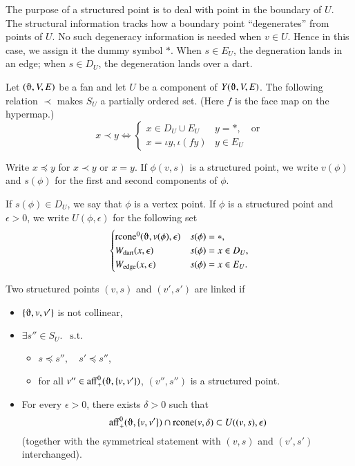 \begin{remark} The purpose of a structured point is to deal with point in the boundary of $U$.  The structural information  tracks how a boundary point ``degenerates'' from points of $U$.  No such degeneracy information is needed when $v\in U$.  Hence in this case, we assign it the dummy symbol $*$.  When $s\in E_U$, the degneration lands in an edge; when $s\in D_U$, the degeneration lands over a dart.
\end{remark}

\begin{lemma}
Let $(\orgn,V,E)$ be a fan and let $U$ be a component of $Y(\orgn,V,E)$.
The following relation $\prec$ makes $S_U$
a partially ordered set.  (Here $f$ is the face map on the hypermap.)
$$
x \prec y \Leftrightarrow   
\begin{cases}
   x \in D_U\cup E_U & y = *,\quad {\text{or}}\\
   x = \iota y, \iota (f y) & y \in E_U
\end{cases}
$$
\end{lemma}

Write $x \preceq y$ for $x \prec y$ or $x = y$.
If $\phi(v,s)$ is a structured point, we write $v(\phi)$ and $s(\phi)$ for the first and second components of $\phi$.  

If $s(\phi)\in D_U$, we say that $\phi$ is a vertex point.  If $\phi$ is a structured point and $\epsilon > 0$, we write $U(\phi,\epsilon)$ for the following set
$$
\begin{cases}
  \op{rcone}^0(\orgn,v(\phi),\epsilon)&s(\phi) = *,   \\
  \Wdart(x,\epsilon)& s(\phi) = x\in D_U,   \\
  \Wedge(x,\epsilon) &s(\phi) = x\in E_U.   \\
\end{cases}
$$

\begin{definition}[link]\label{def:link}  Two structured points $(v,s)$
and $(v',s')$ are linked if
\begin{itemize}
 \item $\{\orgn,v,v'\}$ is not collinear,
 \item $\exists s''\in S_U.\ \ {\text{ s.t.}}$
   \begin{itemize}
     \item $s \preceq s'',\quad s'\preceq s''$,
      \item for all $v''\in\op{aff}_+^0(\orgn,\{v,v'\})$,
           $(v'',s'')$ is a structured point.
   \end{itemize}
 \item For every $\epsilon > 0$, there exists $\delta>0$ such that
   $$
   \op{aff}_+^0(\orgn,\{v,v'\}) \cap \op{rcone}(v,\delta) \subset
     U((v,s),\epsilon)
   $$
   (together with the symmetrical statement with $(v,s)$ and $(v',s')$ interchanged).
\end{itemize}
\end{definition}

